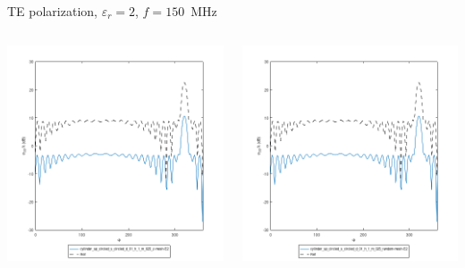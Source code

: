 \begin{frame}{TE polarization, $\varepsilon_r=2$, $f=150$\, MHz}
\begin{columns}

\includegraphics[width=\linewidth]{results/FF/cylD_01_H_1_M_025_Z/epr2_TE_f150.png}


\includegraphics[width=\linewidth]{results/FF/cylD_01_H_1_M_025_RANDOM/epr2_TE_f150.png}


\end{columns}
\end{frame}
